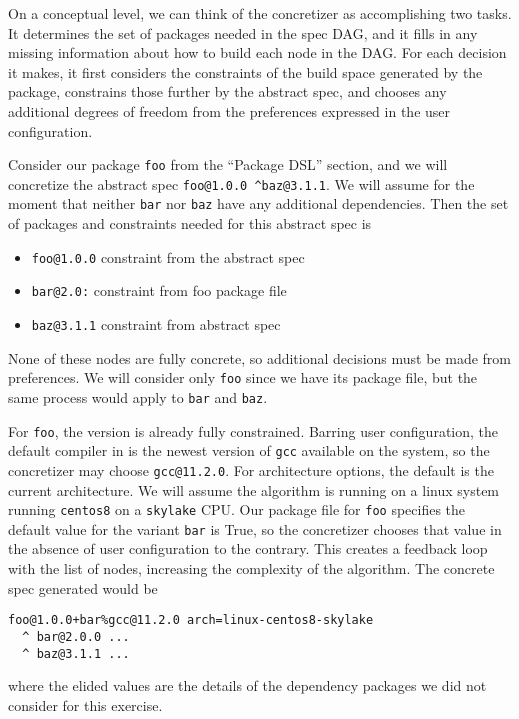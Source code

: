 On a conceptual level, we can think of the concretizer as accomplishing two tasks.
It determines the set of packages needed in the spec DAG, and it fills in any missing information about how to build each node in the DAG.
For each decision it makes, it first considers the constraints of the build space generated by the package, constrains those further by the abstract spec, and chooses any additional degrees of freedom from the preferences expressed in the user configuration.

Consider our package \texttt{foo} from the  ``Package DSL'' section, and we will concretize the abstract spec \texttt{foo@1.0.0 \^{}baz@3.1.1}.
We will assume for the moment that neither \texttt{bar} nor \texttt{baz} have any additional dependencies.
Then the set of packages and constraints needed for this abstract spec is

\begin{itemize}
\item \texttt{foo@1.0.0} constraint from the abstract spec \\
\item \texttt{bar@2.0:} constraint from foo package file \\
\item \texttt{baz@3.1.1} constraint from abstract spec \\
\end{itemize}

None of these nodes are fully concrete, so additional decisions must be made from preferences.
We will consider only \texttt{foo} since we have its package file, but the same process would apply to \texttt{bar} and \texttt{baz}.

For \texttt{foo}, the version is already fully constrained.
Barring user configuration, the default compiler in \spack is the newest version of \texttt{gcc} available on the system, so the concretizer may choose \texttt{gcc@11.2.0}.
For architecture options, the default is the current architecture. We will assume the algorithm is running on a linux system running \texttt{centos8} on a \texttt{skylake} CPU.
Our package file for \texttt{foo} specifies the default value for the variant \texttt{bar} is True, so the concretizer chooses that value in the absence of user configuration to the contrary.
This creates a feedback loop with the list of nodes, increasing the complexity of the algorithm.
The concrete spec generated would be

\begin{verbatim}
foo@1.0.0+bar%gcc@11.2.0 arch=linux-centos8-skylake
  ^ bar@2.0.0 ...
  ^ baz@3.1.1 ...
\end{verbatim}

where the elided values are the details of the dependency packages we did not consider for this exercise.
